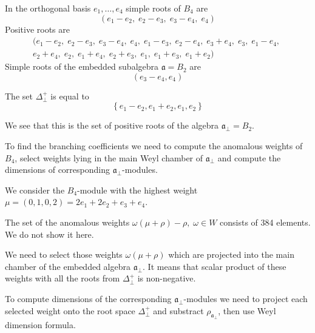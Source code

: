 \documentclass[a4paper,12pt]{article}
\theoremstyle{definition} \newtheorem{Def}{Definition}
\begin{document}
In the orthogonal basis $e_1,\dots,e_4$ simple roots of $B_4$ are
\begin{equation}
  \label{eq:8}
  (e_1 - e_2,\; e_2 - e_3,\; e_3 - e_4,\; e_4)
\end{equation}
Positive roots are
\begin{multline}
  \label{eq:19}
  (e_1 - e_2,\; e_2 - e_3,\; e_3 - e_4,\; e_4,\; e_1 - e_3,\; e_2 - e_4,\; e_3 + e_4,\; e_3,\; e_1 - e_4,\;\\
    e_2 + e_4,\; e_2,\; e_1 + e_4,\; e_2 + e_3,\; e_1,\; e_1 + e_3,\; e_1 + e_2)
\end{multline}
Simple roots of the embedded subalgebra $\mathfrak{a}=B_2$ are
\begin{equation}
  \label{eq:26}
  (e_3-e_4,e_4)
\end{equation}

The set $\Delta^{+}_{\bot}$ is equal to
\begin{equation}
  \label{eq:27}
  \left\{e_1-e_2,e_1+e_2,e_1,e_2\right\}
\end{equation}

We see that this is the set of positive roots of the algebra $\mathfrak{a}_{\bot}=B_2$.

To find the branching coefficients we need to compute the anomalous weights of $B_4$, select weights lying in the main Weyl chamber of $\mathfrak{a}_{\bot}$ and compute the dimensions of corresponding $\mathfrak{a}_{\bot}$-modules.

We consider the $B_4$-module with the highest weight $\mu=(0,1,0,2)=2
e_1 + 2 e_2 + e_3 + e_4$.

The set of the anomalous weights $\omega(\mu+\rho)-\rho,\; \omega\in W$
consists of 384 elements. We do not show it here.

We need to select those weights $\omega(\mu+\rho)$  which are projected into the main chamber of the embedded algebra $\mathfrak{a}_{\bot}$.
It means that scalar product of these weights with all the roots from $\Delta^{+}_{\bot}$ is non-negative.

To compute dimensions of the corresponding
$\mathfrak{a}_{\bot}$-modules we need to project each selected weight
onto the root space $\Delta^{+}_{\bot}$ and substract
$\rho_{\mathfrak{a}_{\bot}}$, then use Weyl dimension formula.
\end{document}
